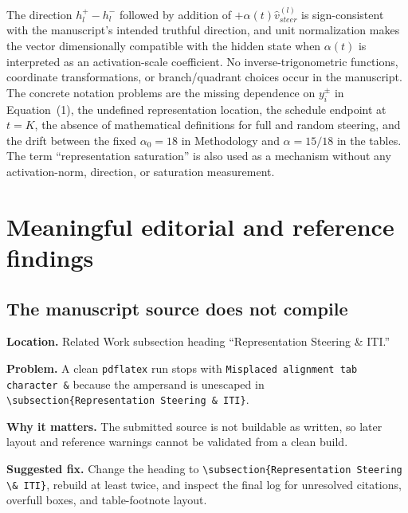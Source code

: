 \documentclass[11pt]{article}
\newcommand{\findinglabel}[1]{\textbf{#1}}
\begin{document}
The direction $h_l^+-h_l^-$ followed by addition of $+\alpha(t)\hat v_{steer}^{(l)}$ is sign-consistent with the manuscript's intended truthful direction, and unit normalization makes the vector dimensionally compatible with the hidden state when $\alpha(t)$ is interpreted as an activation-scale coefficient.  No inverse-trigonometric functions, coordinate transformations, or branch/quadrant choices occur in the manuscript.  The concrete notation problems are the missing dependence on $y_i^{\pm}$ in Equation~(1), the undefined representation location, the schedule endpoint at $t=K$, the absence of mathematical definitions for full and random steering, and the drift between the fixed $\alpha_0=18$ in Methodology and $\alpha=15/18$ in the tables.  The term ``representation saturation'' is also used as a mechanism without any activation-norm, direction, or saturation measurement.

\section*{Meaningful editorial and reference findings}

\subsection*{The manuscript source does not compile}

\findinglabel{Location.} Related Work subsection heading ``Representation Steering \& ITI.''

\findinglabel{Problem.} A clean \texttt{pdflatex} run stops with \texttt{Misplaced alignment tab character \&} because the ampersand is unescaped in \verb|\subsection{Representation Steering & ITI}|.

\findinglabel{Why it matters.} The submitted source is not buildable as written, so later layout and reference warnings cannot be validated from a clean build.

\findinglabel{Suggested fix.} Change the heading to \verb|\subsection{Representation Steering \& ITI}|, rebuild at least twice, and inspect the final log for unresolved citations, overfull boxes, and table-footnote layout.
\end{document}
